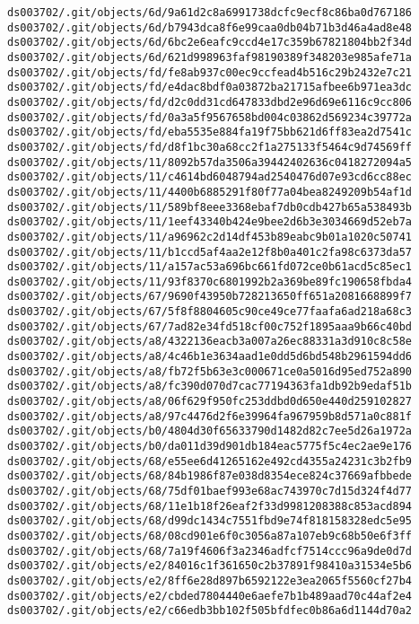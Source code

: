 \documentclass[11pt]{article}
\begin{document}
\begin{Verbatim}[commandchars=\\\{\}]
ds003702/.git/objects/6d/9a61d2c8a6991738dcfc9ecf8c86ba0d767186
ds003702/.git/objects/6d/b7943dca8f6e99caa0db04b71b3d46a4ad8e48
ds003702/.git/objects/6d/6bc2e6eafc9ccd4e17c359b67821804bb2f34d
ds003702/.git/objects/6d/621d998963faf98190389f348203e985afe71a
ds003702/.git/objects/fd/fe8ab937c00ec9ccfead4b516c29b2432e7c21
ds003702/.git/objects/fd/e4dac8bdf0a03872ba21715afbee6b971ea3dc
ds003702/.git/objects/fd/d2c0dd31cd647833dbd2e96d69e6116c9cc806
ds003702/.git/objects/fd/0a3a5f9567658bd004c03862d569234c39772a
ds003702/.git/objects/fd/eba5535e884fa19f75bb621d6ff83ea2d7541c
ds003702/.git/objects/fd/d8f1bc30a68cc2f1a275133f5464c9d74569ff
ds003702/.git/objects/11/8092b57da3506a39442402636c0418272094a5
ds003702/.git/objects/11/c4614bd6048794ad2540476d07e93cd6cc88ec
ds003702/.git/objects/11/4400b6885291f80f77a04bea8249209b54af1d
ds003702/.git/objects/11/589bf8eee3368ebaf7db0cdb427b65a538493b
ds003702/.git/objects/11/1eef43340b424e9bee2d6b3e3034669d52eb7a
ds003702/.git/objects/11/a96962c2d14df453b89eabc9b01a1020c50741
ds003702/.git/objects/11/b1ccd5af4aa2e12f8b0a401c2fa98c6373da57
ds003702/.git/objects/11/a157ac53a696bc661fd072ce0b61acd5c85ec1
ds003702/.git/objects/11/93f8370c6801992b2a369be89fc190658fbda4
ds003702/.git/objects/67/9690f43950b728213650ff651a2081668899f7
ds003702/.git/objects/67/5f8f8804605c90ce49ce77faafa6ad218a68c3
ds003702/.git/objects/67/7ad82e34fd518cf00c752f1895aaa9b66c40bd
ds003702/.git/objects/a8/4322136eacb3a007a26ec88331a3d910c8c58e
ds003702/.git/objects/a8/4c46b1e3634aad1e0dd5d6bd548b2961594dd6
ds003702/.git/objects/a8/fb72f5b63e3c000671ce0a5016d95ed752a890
ds003702/.git/objects/a8/fc390d070d7cac77194363fa1db92b9edaf51b
ds003702/.git/objects/a8/06f629f950fc253ddbd0d650e440d259102827
ds003702/.git/objects/a8/97c4476d2f6e39964fa967959b8d571a0c881f
ds003702/.git/objects/b0/4804d30f65633790d1482d82c7ee5d26a1972a
ds003702/.git/objects/b0/da011d39d901db184eac5775f5c4ec2ae9e176
ds003702/.git/objects/68/e55ee6d41265162e492cd4355a24231c3b2fb9
ds003702/.git/objects/68/84b1986f87e038d8354ece824c37669afbbede
ds003702/.git/objects/68/75df01baef993e68ac743970c7d15d324f4d77
ds003702/.git/objects/68/11e1b18f26eaf2f33d9981208388c853acd894
ds003702/.git/objects/68/d99dc1434c7551fbd9e74f818158328edc5e95
ds003702/.git/objects/68/08cd901e6f0c3056a87a107eb9c68b50e6f3ff
ds003702/.git/objects/68/7a19f4606f3a2346adfcf7514ccc96a9de0d7d
ds003702/.git/objects/e2/84016c1f361650c2b37891f98410a31534e5b6
ds003702/.git/objects/e2/8ff6e28d897b6592122e3ea2065f5560cf27b4
ds003702/.git/objects/e2/cbded7804440e6aefe7b1b489aad70c44af2e4
ds003702/.git/objects/e2/c66edb3bb102f505bfdfec0b86a6d1144d70a2

\end{Verbatim}
\end{document}
